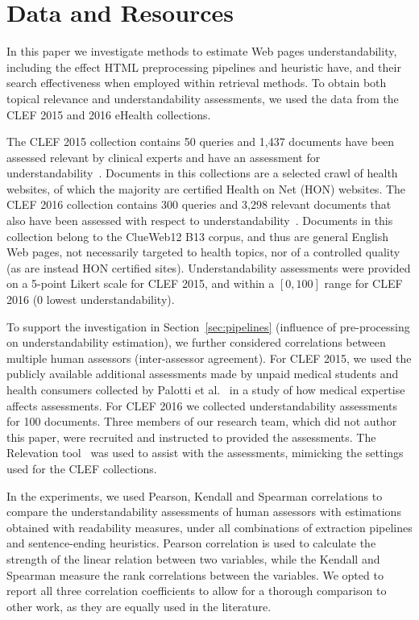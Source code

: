 \section{Data and Resources}
\label{sec:data}

In this paper we investigate methods to estimate Web pages understandability, including the effect HTML preprocessing pipelines and heuristic have, and their search effectiveness when employed within retrieval methods. To obtain both topical relevance and  understandability assessments, we used the data from the CLEF 2015 and 2016 eHealth collections. 

The CLEF 2015 collection contains 50 queries and 1,437 documents have been assessed relevant by clinical experts and have an assessment for understandability~\cite{clef15}. Documents in this collections are a selected crawl of health websites, of which the majority are certified Health on Net (HON) websites.
The CLEF 2016 collection contains 300 queries and 3,298 relevant documents that also have been assessed with respect to understandability~\cite{clef16}. Documents in this collection belong to the ClueWeb12 B13 corpus, and thus are general English Web pages, not necessarily targeted to health topics, nor of a controlled quality (as are instead HON certified sites). 
Understandability assessments were provided on a 5-point Likert scale for CLEF 2015, and within a $[0,100]$ range for CLEF 2016 (0 lowest understandability). 

To support the investigation in Section~\ref{sec:pipelines} (influence of pre-processing on understandability estimation), we further considered correlations between multiple human assessors (inter-assessor agreement). For CLEF 2015, we used the publicly available additional assessments made by unpaid medical students and health consumers collected by Palotti et al.~\cite{palotti16b} in a study of how medical expertise affects assessments. For CLEF 2016 we  collected understandability assessments for 100 documents. Three members of our research team, which did not author this paper, were recruited and instructed to provided the assessments. The Relevation tool~\cite{koopman14} was used to assist with the assessments, mimicking the settings used for the CLEF collections.

In the experiments, we used Pearson, Kendall and Spearman correlations to compare the understandability assessments of human assessors with estimations obtained with readability measures, under all combinations of extraction pipelines and sentence-ending heuristics. Pearson correlation is used to calculate the strength of the linear relation between two variables, while the Kendall and Spearman measure the rank correlations between the variables. We opted to report all three correlation coefficients to allow for a thorough comparison to other work, as they are equally used in the literature. 

